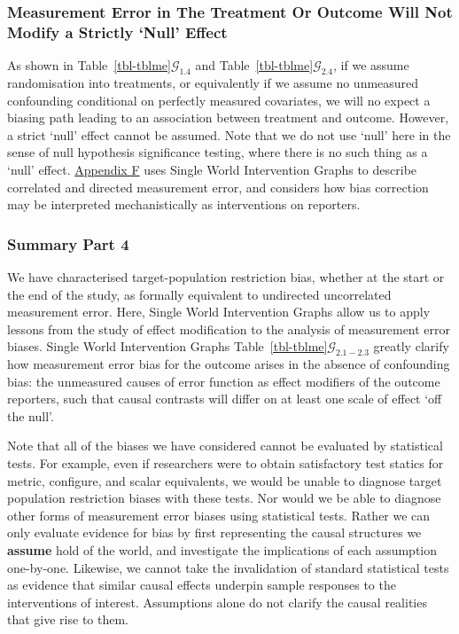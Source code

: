 \documentclass[
  single column]{article}
\begin{document}
\subsubsection{Measurement Error in The Treatment Or Outcome Will Not
Modify a Strictly `Null'
Effect}\label{measurement-error-in-the-treatment-or-outcome-will-not-modify-a-strictly-null-effect}

As shown in Table~\ref{tbl-tblme}\(\mathcal{G}_{1.4}\) and
Table~\ref{tbl-tblme}\(\mathcal{G}_{2.4}\), if we assume randomisation
into treatments, or equivalently if we assume no unmeasured confounding
conditional on perfectly measured covariates, we will no expect a
biasing path leading to an association between treatment and outcome.
However, a strict `null' effect cannot be assumed. Note that we do not
use `null' here in the sense of null hypothesis significance testing,
where there is no such thing as a `null' effect.
\hyperref[id-app-F]{Appendix F} uses Single World Intervention Graphs to
describe correlated and directed measurement error, and considers how
bias correction may be interpreted mechanistically as interventions on
reporters.

\subsubsection{Summary Part 4}\label{summary-part-4}

We have characterised target-population restriction bias, whether at the
start or the end of the study, as formally equivalent to undirected
uncorrelated measurement error. Here, Single World Intervention Graphs
allow us to apply lessons from the study of effect modification to the
analysis of measurement error biases. Single World Intervention Graphs
Table~\ref{tbl-tblme}\(\mathcal{G}_{2.1-2.3}\) greatly clarify how
measurement error bias for the outcome arises in the absence of
confounding bias: the unmeasured causes of error function as effect
modifiers of the outcome reporters, such that causal contrasts will
differ on at least one scale of effect `off the null'.

Note that all of the biases we have considered cannot be evaluated by
statistical tests. For example, even if researchers were to obtain
satisfactory test statics for metric, configure, and scalar equivalents,
we would be unable to diagnose target population restriction biases with
these tests. Nor would we be able to diagnose other forms of measurement
error biases using statistical tests. Rather we can only evaluate
evidence for bias by first representing the causal structures we
\textbf{assume} hold of the world, and investigate the implications of
each assumption one-by-one. Likewise, we cannot take the invalidation of
standard statistical tests as evidence that similar causal effects
underpin sample responses to the interventions of interest. Assumptions
alone do not clarify the causal realities that give rise to them.
\end{document}
